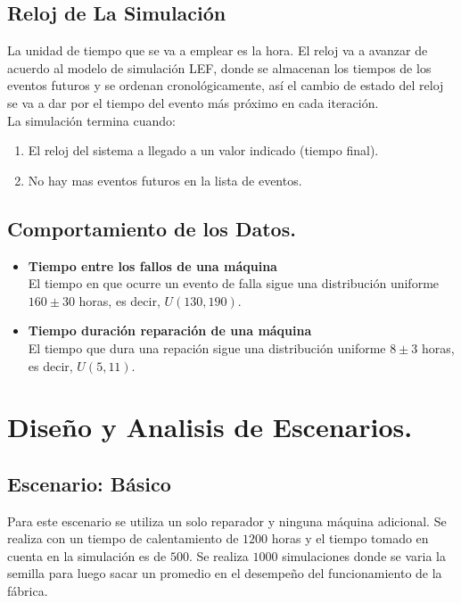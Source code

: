 \documentclass[12pt]{article}
\begin{document}
\subsection{Reloj de La Simulación}

La unidad de tiempo que se va a emplear es la hora. El reloj va a avanzar de acuerdo al modelo de simulación LEF, donde se almacenan los tiempos de los eventos futuros y se ordenan cronológicamente, así el cambio de estado del reloj  se va a dar por el tiempo del evento más próximo en cada iteración.\\

La simulación termina cuando:
\begin{enumerate}
\item El reloj del sistema a llegado a un valor indicado (tiempo final).
\item No hay mas eventos futuros en la lista de eventos.
\end{enumerate}

\subsection{Comportamiento de los Datos.}

\begin{itemize}
\item \textbf{Tiempo entre los fallos de una m\'aquina}\\
El tiempo en que ocurre un evento de falla sigue una distribución uniforme $160\pm30$ horas, es decir,  $U(130,190)$.

\item \textbf{Tiempo duraci\'on reparaci\'on de una m\'aquina}\\
El tiempo que dura una repaci\'on sigue una distribuci\'on uniforme $8\pm3$ horas, es decir, $U(5,11)$.

\end{itemize}



\section{Diseño y Analisis de Escenarios.}

\subsection{Escenario: B\'asico}

Para este escenario se utiliza un solo reparador y ninguna máquina adicional. Se realiza con un tiempo de calentamiento de $1200$ horas y el tiempo tomado en cuenta en la simulación es de $500$. Se realiza $1000$ simulaciones donde se varia la semilla para luego sacar un promedio en el desempeño del funcionamiento de la fábrica.
\end{document}
